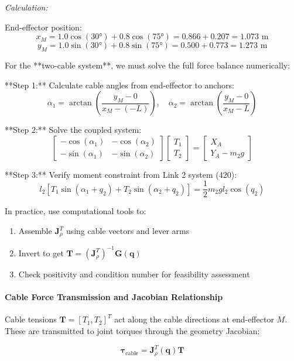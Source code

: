 \textit{Calculation:}

End-effector position:
$$x_M = 1.0 \cos(30°) + 0.8 \cos(75°) = 0.866 + 0.207 = 1.073 \text{ m}$$
$$y_M = 1.0 \sin(30°) + 0.8 \sin(75°) = 0.500 + 0.773 = 1.273 \text{ m}$$

For the **two-cable system**, we must solve the full force balance numerically:

**Step 1:** Calculate cable angles from end-effector to anchors:
$$\alpha_1 = \arctan\left(\frac{y_M - 0}{x_M - (-L)}\right), \quad \alpha_2 = \arctan\left(\frac{y_M - 0}{x_M - L}\right)$$

**Step 2:** Solve the coupled system:
$$\begin{bmatrix}
-\cos(\alpha_1) & -\cos(\alpha_2) \\
-\sin(\alpha_1) & -\sin(\alpha_2)
\end{bmatrix} \begin{bmatrix} T_1 \\ T_2 \end{bmatrix} = \begin{bmatrix} X_A \\ Y_A - m_2 g \end{bmatrix}$$

**Step 3:** Verify moment constraint from Link 2 system (420):
$$l_2[T_1\sin(\alpha_1+q_2) + T_2\sin(\alpha_2+q_2)] = \frac{1}{2}m_2 g l_2 \cos(q_2)$$

In practice, use computational tools to:
\begin{enumerate}
    \item Assemble $\mathbf{J}_{\rho}^T$ using cable vectors and lever arms
    \item Invert to get $\mathbf{T} = (\mathbf{J}_{\rho}^T)^{-1} \mathbf{G}(\mathbf{q})$
    \item Check positivity and condition number for feasibility assessment
\end{enumerate}

\paragraph{Cable Force Transmission and Jacobian Relationship}

Cable tensions $\mathbf{T} = [T_1, T_2]^T$ act along the cable directions at end-effector $M$. These are transmitted to joint torques through the geometry Jacobian:

\begin{equation}
\boldsymbol{\tau}_{\text{cable}} = \mathbf{J}_{\rho}^T(\mathbf{q}) \mathbf{T}
\end{equation}

